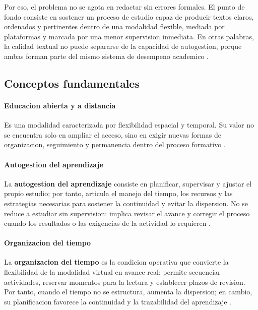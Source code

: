 \documentclass[
	spanish,
	letterpaper, oneside
]{article}
\begin{document}
Por eso, el problema no se agota en redactar sin errores formales. El punto de fondo consiste en sostener un proceso de estudio capaz de producir textos claros, ordenados y pertinentes dentro de una modalidad flexible, mediada por plataformas y marcada por una menor supervision inmediata. En otras palabras, la calidad textual no puede separarse de la capacidad de autogestion, porque ambas forman parte del mismo sistema de desempeno academico \citep{vitoriaEscrituraAcademicaFormacion2019,correaManualBasicoEscritura2018}.

\subsection{Conceptos fundamentales}

\paragraph{Educacion abierta y a distancia}
Es una modalidad caracterizada por flexibilidad espacial y temporal. Su valor no se encuentra solo en ampliar el acceso, sino en exigir nuevas formas de organizacion, seguimiento y permanencia dentro del proceso formativo \citep{vitoriaEscrituraAcademicaFormacion2019}.

\paragraph{\textbf{Autogestion del aprendizaje}}
La \textbf{autogestion del aprendizaje} consiste en planificar, supervisar y ajustar el propio estudio; por tanto, articula el manejo del tiempo, los recursos y las estrategias necesarias para sostener la continuidad y evitar la dispersion. No se reduce a estudiar sin supervision: implica revisar el avance y corregir el proceso cuando los resultados o las exigencias de la actividad lo requieren \citep{vitoriaEscrituraAcademicaFormacion2019,correaManualBasicoEscritura2018}.

\paragraph{\textbf{Organizacion del tiempo}}
La \textbf{organizacion del tiempo} es la condicion operativa que convierte la flexibilidad de la modalidad virtual en avance real: permite secuenciar actividades, reservar momentos para la lectura y establecer plazos de revision. Por tanto, cuando el tiempo no se estructura, aumenta la dispersion; en cambio, su planificacion favorece la continuidad y la trazabilidad del aprendizaje \citep{vitoriaEscrituraAcademicaFormacion2019,correaManualBasicoEscritura2018}.
\end{document}
